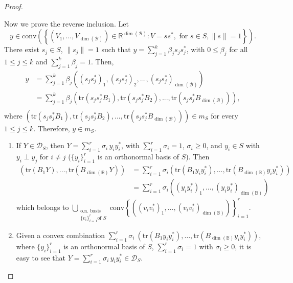 \documentclass[12pt,a4paper]{article}
\def\calB{\mathcal B}
\def\DS{\mathcal{D}_S}
\def\R{\mathbb R}
\def\tr{\text{tr}}
\numberwithin{equation}{section}
\begin{document}
\begin{proof}
\begin{enumerate}
	Now we prove the reverse inclusion. Let 
	\[y\in \text{conv} \left(\left\{(V_1, \dots,V_{\dim(\calB)})\in\R^{\dim(\calB)}:V=s s^*, \text{ for } s\in S, \|s\|=1  \right\} \right).\] 
	There exist $s_j\in S$, $\|s_j\|=1$ such that 
	$	y = \sum_{j=1}^{k}\beta_js_js_j^*$,
	with $0\leq \beta_j$ for all $1\leq j\leq k$ and $\sum_{j=1}^{k}\beta_j=1$. Then,
	\begin{align*}
		y& = \sum_{j=1}^{k}\beta_j\left( (s_js_j^*)_1,(s_js_j^*)_2,..., (s_js_j^*)_{\dim(\calB)}\right) \\
		& = \sum_{j=1}^{k}\beta_j\left( \tr(s_js_j^*B_1),\tr(s_js_j^*B_2),..., \tr(s_js_j^*B_{\dim(\calB)})\right),\\
	\end{align*}
		where $\left( \tr(s_js_j^*B_1),\tr(s_js_j^*B_2),..., \tr(s_js_j^*B_{\dim(\calB)})\right)\in m_S$ for every $1\leq j\leq k$. Therefore, $y\in m_S$.
	\end{enumerate}
 
	\begin{enumerate}
		\item[\ref{item4Prop1} $\Rightarrow$ \ref{item3Prop1}.]  If $Y\in \mathcal{D}_S$, then $Y=\sum_{i=1}^r \sigma_i\, y_iy_i^*$, with $\sum_{i=1}^r\sigma_i=1$, $\sigma_i\geq 0$, and $y_i\in S$ with $y_i\perp y_j$ for $i\neq j$ ($\{y_i\}_{i=1}^r$ is an orthonormal basis of $S$). Then 
	\begin{equation*}\begin{split}
			(\tr(B_1 Y),\dots,\tr(B_{\dim(\mathbb{B})} Y))&=\sum_{i=1}^r\sigma_i \left(\tr(B_1y_iy_i^*),\dots ,\tr(B_{\dim(\mathbb{B})} y_iy_i^*)\right)\\
			&=	\sum_{i=1}^r\sigma_i \left((y_iy_i^*)_1,\dots ,(y_iy_i^*)_{\dim(\mathbb{B})}\right)
		\end{split}
	\end{equation*}
	which belongs to $\mathop{\bigcup}\limits_{\substack{\text{o.n. basis}  \\
			\{v_i\}_{i=1}^{r} \text{of } S}}
	\text{conv}\left\{ \left(\left(v_i v_i^*\right)_1,\dots, \left(v_i v_i^*\right)_{{\dim(\mathbb{B})}} \right)  \right\}_{i=1}^{r}$.
	
	\item[\ref{item3Prop1} $\Rightarrow$ \ref{item4Prop1}.] Given a convex combination $ \sum_{i=1}^r \sigma_i\ \left(\tr(B_1 y_iy_i^*),\dots,\tr(B_{\dim(\mathbb{B})} y_iy_i^*) \right)$, where $\{y_i\}_{i=1}^r$ is  an orthonormal basis of $S$, $\sum_{i=1}^r\sigma_i=1$ with $\sigma_i\geq 0$, it is easy to see that $Y=\sum_{i=1}^r \sigma_i \, y_iy_i^*\in\DS$.  
 

\end{enumerate}
\end{proof}
\end{document}
